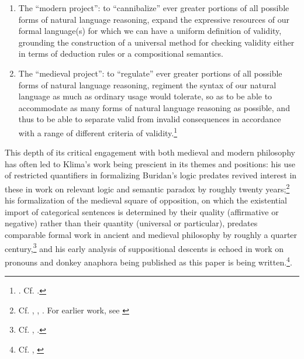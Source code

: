 \documentclass[]{article}
\begin{document}
\begin{enumerate}
	\item[(1)] The “modern project”: to “cannibalize” ever greater portions of all
	possible forms of natural language reasoning, expand the expressive
	resources of our formal language(s) for which we can have a uniform
	definition of validity, grounding the construction of a universal
	method for checking validity either in terms of deduction rules or a
	compositional semantics.
	\item[(2)] The “medieval project”: to “regulate” ever greater portions of all
	possible forms of natural language reasoning, regiment the syntax
	of our natural language as much as ordinary usage would tolerate,
	so as to be able to accommodate as many forms of natural language
	reasoning as possible, and thus to be able to separate valid from
	invalid consequences in accordance with a range of different criteria
	of validity.\footnote{\autocite[341]{Klima2016}. Cf. \autocite[429-430]{Klima2008a}.}
\end{enumerate}

This depth of its critical engagement with both medieval and modern philosophy 
has often led to Klima's work being prescient 
in its themes and positions:
his use of restricted quantifiers in formalizing Buridan's logic predates revived interest in these 
in 
work on relevant logic 
and semantic paradox 
by roughly twenty years;\footnote{
	Cf. \autocite{Klima1988}, \autocite{Beall2006}, \autocite{Field2014}. For earlier work, see \autocite{Hailperin1957a,Hailperin1957b}
} 
his formalization of the medieval square of opposition, 
on which the existential import of categorical sentences is determined by their quality (affirmative or negative) 
rather than their quantity (universal or particular), 
predates comparable formal work in ancient and medieval philosophy by roughly a quarter century,\footnote{Cf. \autocite[18-43]{Klima1988}, \autocite{Chatti2013} \autocite{Read2015b}.} 
and his early analysis of suppositional descents 
is echoed in work on pronouns and donkey anaphora being published as this paper is being written.\footnote{Cf. \autocite{Klima1990}, \autocite{Blumberg2021}}.
\end{document}
